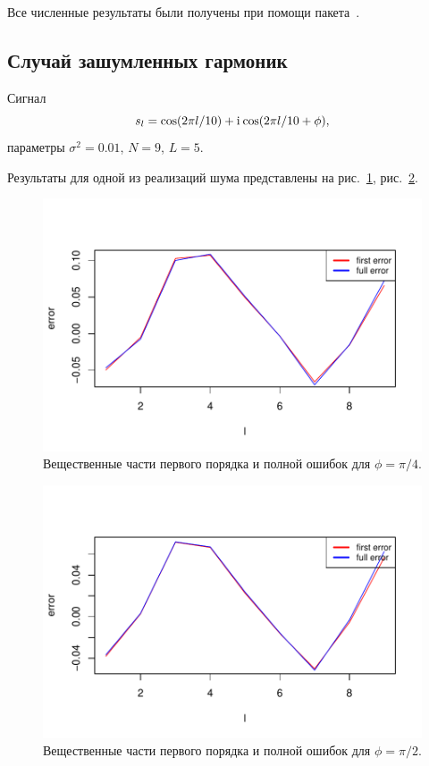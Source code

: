\documentclass[specialist,
               substylefile = spbu.rtx,
               subf,href,colorlinks=true, 12pt]{disser}
\begin{document}
Все численные результаты были получены при помощи пакета~\cite{Korobeynikov.etal2014}.

\subsection{Случай зашумленных гармоник}
Сигнал
$$s_l = \cos(2 \pi l / 10) + \mathrm{i}\mkern1mu\cos(2 \pi l / 10 + \phi),$$ 
параметры $\sigma^2 = 0.01$, $N = 9$, $L = 5$. 

Результаты для одной из реализаций шума представлены на рис.~\ref{fig:harm_noise_pi_4}, рис.~\ref{fig:harm_noise_pi_2}.

\begin{figure}[H]
	\begin{center}
		\includegraphics[width=0.6\linewidth]{img/first_vs_full_re.pdf}
		\caption{Вещественные части первого порядка и полной ошибок для $\phi = \pi / 4$.}
		\label{fig:harm_noise_pi_4}
	\end{center}
\end{figure}

\begin{figure}[H]
	\begin{center}
		\includegraphics[width=0.6\linewidth]{img/first_vs_full_re_2.pdf}
		\caption{Вещественные части первого порядка и полной ошибок для $\phi = \pi / 2$.}
		\label{fig:harm_noise_pi_2}
	\end{center}
\end{figure}
\end{document}
